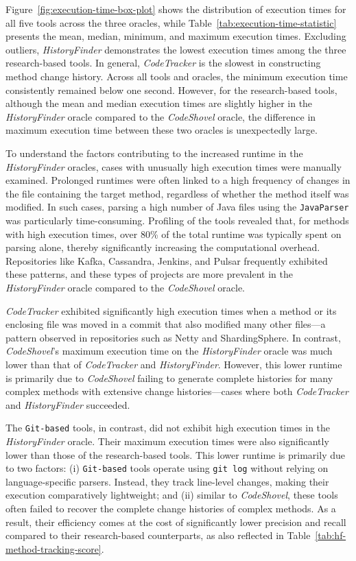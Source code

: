Figure~\ref{fig:execution-time-box-plot} shows the distribution of execution times for all five tools across the three oracles, while Table~\ref{tab:execution-time-statistic} presents the mean, median, minimum, and maximum execution times. Excluding outliers, \textit{HistoryFinder} demonstrates the lowest execution times among the three research-based tools. In general, \textit{CodeTracker} is the slowest in constructing method change history. Across all tools and oracles, the minimum execution time consistently remained below one second. However, for the research-based tools, although the mean and median execution times are slightly higher in the \emph{HistoryFinder} oracle compared to the \emph{CodeShovel} oracle, the difference in maximum execution time between these two oracles is unexpectedly large.

To understand the factors contributing to the increased runtime in the \textit{HistoryFinder} oracles, cases with unusually high execution times were manually examined. Prolonged runtimes were often linked to a high frequency of changes in the file containing the target method, regardless of whether the method itself was modified. In such cases, parsing a high number of Java files using the \texttt{JavaParser} was particularly time-consuming. Profiling of the tools revealed that, for methods with high execution times, over 80\% of the total runtime was typically spent on parsing alone, thereby significantly increasing the computational overhead. Repositories like Kafka, Cassandra, Jenkins, and Pulsar frequently exhibited these patterns, and these types of projects are more prevalent in the \textit{HistoryFinder} oracle compared to the \textit{CodeShovel} oracle.

\textit{CodeTracker} exhibited significantly high execution times when a method or its enclosing file was moved in a commit that also modified many other files—a pattern observed in repositories such as Netty and ShardingSphere. In contrast, \textit{CodeShovel}'s maximum execution time on the \textit{HistoryFinder} oracle was much lower than that of \textit{CodeTracker} and \textit{HistoryFinder}. However, this lower runtime is primarily due to \textit{CodeShovel} failing to generate complete histories for many complex methods with extensive change histories—cases where both \textit{CodeTracker} and \textit{HistoryFinder} succeeded.


The \texttt{Git-based} tools, in contrast, did not exhibit high execution times in the \textit{HistoryFinder} oracle. Their maximum execution times were also significantly lower than those of the research-based tools. This lower runtime is primarily due to two factors: (i) \texttt{Git-based} tools operate using \texttt{git log} without relying on language-specific parsers. Instead, they track line-level changes, making their execution comparatively lightweight; and (ii) similar to \textit{CodeShovel}, these tools often failed to recover the complete change histories of complex methods. As a result, their efficiency comes at the cost of significantly lower precision and recall compared to their research-based counterparts, as also reflected in Table~\ref{tab:hf-method-tracking-score}.

